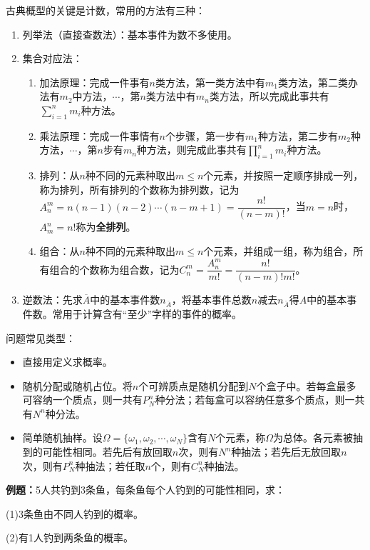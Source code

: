 \documentclass[UTF8, 12pt]{ctexart}
\begin{document}
古典概型的关键是计数，常用的方法有三种：

\begin{enumerate}
    \item 列举法（直接查数法）：基本事件为数不多使用。
    \item 集合对应法：\begin{enumerate}
        \item 加法原理：完成一件事有$n$类方法，第一类方法中有$m_1$类方法，第二类办法有$m_2$中方法，$\cdots$，第$n$类方法中有$m_n$类方法，所以完成此事共有$\sum\limits_{i=1}^nm_i$种方法。 
        \item 乘法原理：完成一件事情有$n$个步骤，第一步有$m_1$种方法，第二步有$m_2$种方法，$\cdots$，第$n$步有$m_n$种方法，则完成此事共有$\prod\limits_{i=1}^nm_i$种方法。   
        \item 排列：从$n$种不同的元素种取出$m\leqslant n$个元素，并按照一定顺序排成一列，称为排列，所有排列的个数称为排列数，记为$A_n^m=n(n-1)(n-2)\cdots(n-m+1)=\dfrac{n!}{(n-m)!}$，当$m=n$时，$A_m^n=n!$称为\textbf{全排列}。
        \item 组合：从$n$种不同的元素种取出$m\leqslant n$个元素，并组成一组，称为组合，所有组合的个数称为组合数，记为$C_n^m=\dfrac{A_n^m}{m!}=\dfrac{n!}{(n-m)!m!}$。
    \end{enumerate}
    \item 逆数法：先求$\overline{A}$中的基本事件数$n_{\overline{A}}$，将基本事件总数$n$减去$n_{\overline{A}}$得$A$中的基本事件数。常用于计算含有“至少”字样的事件的概率。
\end{enumerate}

问题常见类型：

\begin{itemize}
    \item 直接用定义求概率。
    \item 随机分配或随机占位。将$n$个可辨质点是随机分配到$N$个盒子中。若每盒最多可容纳一个质点，则一共有$P_N^n$种分法；若每盒可以容纳任意多个质点，则一共有$N^n$种分法。
    \item 简单随机抽样。设$\Omega=\{\omega_1,\omega_2,\cdots,\omega_N\}$含有$N$个元素，称$\Omega$为总体。各元素被抽到的可能性相同。若先后有放回取$n$次，则有$N^n$种抽法；若先后无放回取$n$次，则有$P_N^n$种抽法；若任取$n$个，则有$C_N^n$种抽法。
\end{itemize}

\textbf{例题：}5人共钓到3条鱼，每条鱼每个人钓到的可能性相同，求：

(1)3条鱼由不同人钓到的概率。

(2)有1人钓到两条鱼的概率。
\end{document}
